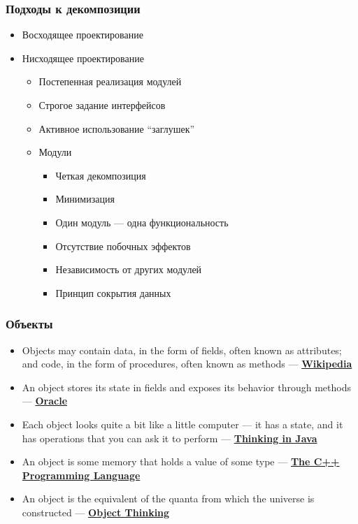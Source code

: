 \documentclass[xetex,mathserif,serif]{beamer}
\begin{document}
	\begin{frame}
		\frametitle{Подходы к декомпозиции}
		\begin{itemize}
			\item Восходящее проектирование
			\item Нисходящее проектирование
			\begin{itemize}
				\item Постепенная реализация модулей
				\item Строгое задание интерфейсов
				\item Активное использование ``заглушек''
				\item Модули
				\begin{itemize}
					\item Четкая декомпозиция
					\item Минимизация
					\item Один модуль --- одна функциональность
					\item Отсутствие побочных эффектов
					\item Независимость от других модулей
					\item Принцип сокрытия данных
				\end{itemize}
			\end{itemize}
		\end{itemize}
	\end{frame}

	\begin{frame}
		\frametitle{Объекты}
		\begin{itemize}
			\item Objects may contain data, in the form of fields, often known as attributes; and code, in the form of procedures, often known as methods --- \textbf{\href{https://en.wikipedia.org/wiki/Object-oriented\_programming}{Wikipedia}}
			\item An object stores its state in fields and exposes its behavior through methods --- \textbf{\href{https://docs.oracle.com/javase/tutorial/java/concepts/object.html}{Oracle}}
			\item Each object looks quite a bit like a little computer --- it has a state, and it has operations that you can ask it to perform --- \textbf{\href{http://amzn.to/1PBmQpm}{Thinking in Java}}
			\item An object is some memory that holds a value of some type --- \textbf{\href{http://amzn.to/1XyGCtk}{The C++ Programming Language}}
			\item An object is the equivalent of the quanta from which the universe is constructed --- \textbf{\href{http://amzn.to/266oJr4}{Object Thinking}}
		\end{itemize}
	\end{frame}
\end{document}
